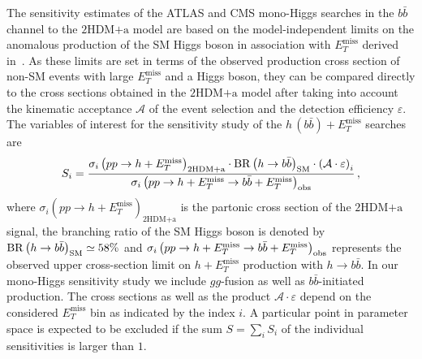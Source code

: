 \documentclass[review]{elsarticle}
\newcommand{\MET}{\ensuremath{E_T^\mathrm{miss}}\xspace}
\newcommand{\met}{\MET}
\newcommand{\hdma}{\ensuremath{\textrm{2HDM+a}}\xspace}
\begin{document}
The sensitivity estimates of the ATLAS and CMS mono-Higgs searches in the $b \bar b$ channel to the \hdma model are based on the model-independent limits on the anomalous production of the SM Higgs boson in association with \met derived in~\cite{Aaboud:2017yqz}.  As these limits are set in terms of the observed production cross section of non-SM events with large $\MET$ and a Higgs boson, they can be compared directly to the cross sections obtained in the \hdma model after taking into account the kinematic acceptance $\mathcal{A}$ of the event selection and the detection efficiency $\varepsilon$. The variables of interest for the sensitivity study of the $h \, (b \bar b) + \MET$ searches are
\begin{equation}
\label{eq:monoHbb_sensi}
S_i = \frac{\sigma_{i} \left ( p p \to h + \MET \right)_{\hdma} \cdot {\rm BR} \left (h \to b \bar b \right )_{\rm SM} \cdot \left ( \mathcal{A} \cdot \varepsilon \right)_i}
{\sigma_{i} \left ( p p \to h + \MET \to b \bar b + \MET \right)_{\rm obs}}\,,
\end{equation}
where $\sigma_{i} \left ( p p \to h + \MET \right)_{\hdma}$ is the partonic cross section of the \hdma signal,  the branching ratio of the SM Higgs boson is denoted by ${\rm BR} \left (h \to b \bar b \right )_{\rm SM} \simeq 58\%$  and $\sigma_{i} \left ( p p \to h + \MET \to b \bar b + \MET \right)_{\rm obs}$ represents the  observed upper cross-section limit on $h + \MET$ production with $h \to b \bar b$. In our mono-Higgs sensitivity study we include $gg$-fusion as well as $b \bar b$-initiated production.  The cross sections as well as the product $ \mathcal{A} \cdot \varepsilon$ depend on the considered $\MET$ bin as indicated by the index $i$.   A particular point in parameter space is expected to be excluded if the sum $S = \sum_i S_i$ of the individual sensitivities is larger than $1$.
\end{document}
